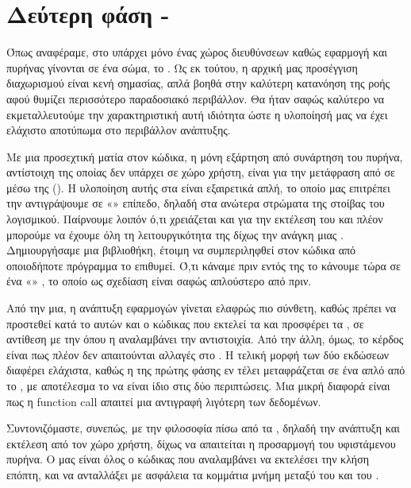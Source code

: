 \section{Δεύτερη φάση - }

Όπως αναφέραμε, στο  υπάρχει μόνο ένας χώρος διευθύνσεων
καθώς εφαρμογή και πυρήνας γίνονται  σε ένα σώμα, το
. Ως εκ τούτου, η αρχική μας προσέγγιση διαχωρισμού είναι κενή σημασίας,
απλά βοηθά στην καλύτερη κατανόηση της ροής αφού θυμίζει
περισσότερο παραδοσιακό περιβάλλον. Θα ήταν σαφώς καλύτερο να
εκμεταλλευτούμε την χαρακτηριστική αυτή ιδιότητα ώστε η υλοποίησή μας να
έχει ελάχιστο αποτύπωμα στο περιβάλλον ανάπτυξης.
\newline

Με μια προσεχτική ματία στον κώδικα, η μόνη εξάρτηση από συνάρτηση του πυρήνα,
αντίστοιχη της οποίας δεν υπάρχει σε χώρο χρήστη, είναι για
την μετάφραση από  σε  μέσω της
(). Η υλοποίηση αυτής στα  είναι εξαιρετικά
απλή, το οποίο μας επιτρέπει την αντιγράψουμε
σε «» επίπεδο, δηλαδή στα ανώτερα στρώματα της στοίβας του λογισμικού.
Παίρνουμε λοιπόν ό,τι χρειάζεται και για την εκτέλεση του
 και πλέον μπορούμε να έχουμε όλη τη λειτουργικότητα
της  δίχως την ανάγκη μιας . Δημιουργήσαμε μια
βιβλιοθήκη, έτοιμη να συμπεριληφθεί στον κώδικα από οποιοδήποτε πρόγραμμα το
επιθυμεί. Ό,τι κάναμε πριν εντός της  το κάνουμε τώρα
σε ένα «» , το οποίο ως σχεδίαση είναι σαφώς
απλούστερο από πριν.
\newline

Από την μια, η ανάπτυξη εφαρμογών γίνεται ελαφρώς πιο σύνθετη, καθώς
πρέπει να προστεθεί κατά το  αυτών και ο κώδικας
που εκτελεί τα  και προσφέρει τα ,
σε αντίθεση με την  όπου η  αναλαμβάνει την
αντιστοιχία. Από την άλλη, όμως, το κέρδος είναι πως πλέον δεν απαιτούνται
αλλαγές στο . Η τελική μορφή των δύο εκδώσεων διαφέρει ελάχιστα,
καθώς η  της πρώτης φάσης
εν τέλει μεταφράζεται σε ένα απλό  από το ,
με αποτέλεσμα το  να είναι ίδιο στις δύο περιπτώσεις. Μια μικρή διαφορά
είναι πως η function call απαιτεί μια αντιγραφή λιγότερη των δεδομένων.
\newline

Συντονιζόμαστε, συνεπώς, με την φιλοσοφία πίσω από τα ,
δηλαδή την ανάπτυξη και εκτέλεση  από τον χώρο χρήστη,
δίχως να απαιτείται η προσαρμογή του υφιστάμενου πυρήνα. Ο 
μας είναι όλος ο κώδικας που αναλαμβάνει να εκτελέσει την κλήση
επόπτη, και να ανταλλάξει με ασφάλεια τα κομμάτια μνήμη μεταξύ
του  και του .

